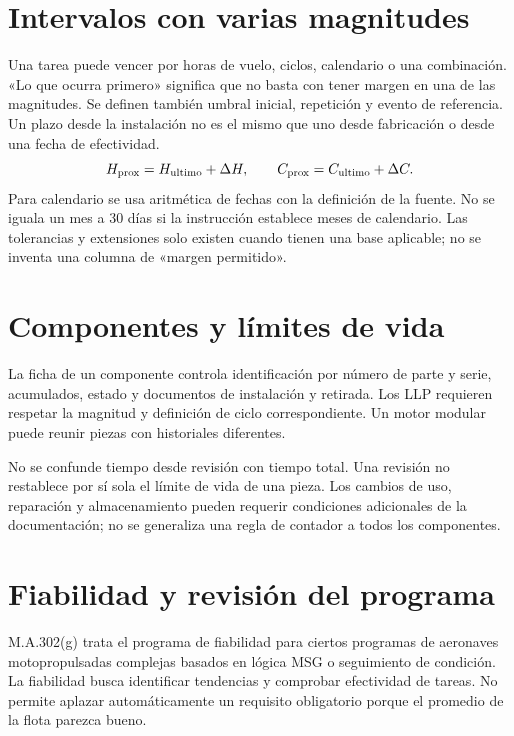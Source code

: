 \section{Intervalos con varias magnitudes}
Una tarea puede vencer por horas de vuelo, ciclos, calendario o una combinación. «Lo que ocurra primero» significa que no basta con tener margen en una de las magnitudes. Se definen también umbral inicial, repetición y evento de referencia. Un plazo desde la instalación no es el mismo que uno desde fabricación o desde una fecha de efectividad.
\begin{equation}H_{\rm prox}=H_{\rm ultimo}+\Delta H,\qquad C_{\rm prox}=C_{\rm ultimo}+\Delta C.\label{eq:vencimiento}\end{equation}
Para calendario se usa aritmética de fechas con la definición de la fuente. No se iguala un mes a 30 días si la instrucción establece meses de calendario. Las tolerancias y extensiones solo existen cuando tienen una base aplicable; no se inventa una columna de «margen permitido».
\section{Componentes y límites de vida}
La ficha de un componente controla identificación por número de parte y serie, acumulados, estado y documentos de instalación y retirada. Los LLP requieren respetar la magnitud y definición de ciclo correspondiente. Un motor modular puede reunir piezas con historiales diferentes.

No se confunde tiempo desde revisión con tiempo total. Una revisión no restablece por sí sola el límite de vida de una pieza. Los cambios de uso, reparación y almacenamiento pueden requerir condiciones adicionales de la documentación; no se generaliza una regla de contador a todos los componentes.
\section{Fiabilidad y revisión del programa}
M.A.302(g) trata el programa de fiabilidad para ciertos programas de aeronaves motopropulsadas complejas basados en lógica MSG o seguimiento de condición. La fiabilidad busca identificar tendencias y comprobar efectividad de tareas. No permite aplazar automáticamente un requisito obligatorio porque el promedio de la flota parezca bueno.

